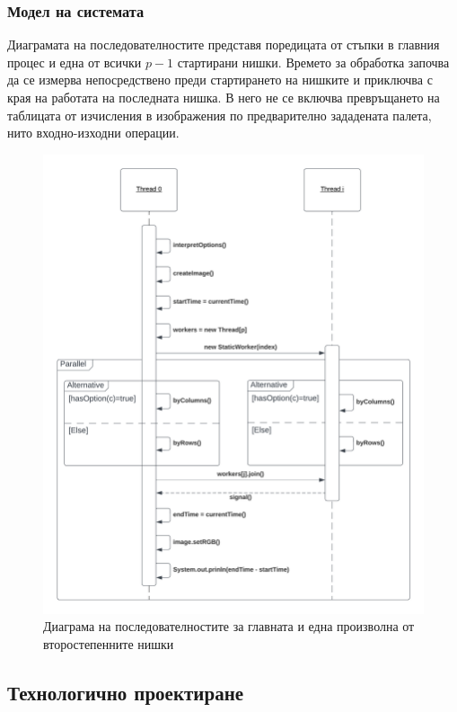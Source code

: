 \documentclass[a4paper,11pt]{article}
\begin{document}
\subsubsection{Модел на системата}
Диаграмата на последователностите представя поредицата от стъпки в главния процес и една от всички $p-1$ стартирани нишки. Времето за обработка започва да се измерва непосредствено преди стартирането на нишките и приключва с края на работата на последната нишка. В него не се включва превръщането на таблицата от изчисления в изображения по предварително зададената палета, нито входно-изходни операции. 
\begin{figure}[H]
    \centering    \includegraphics[width=0.9\linewidth]{images/sequence.png}
    \caption{Диаграма на последователностите за главната и една произволна от второстепенните нишки}
    \label{fig:sequence}
\end{figure}
\subsection{Технологично проектиране}
\end{document}
